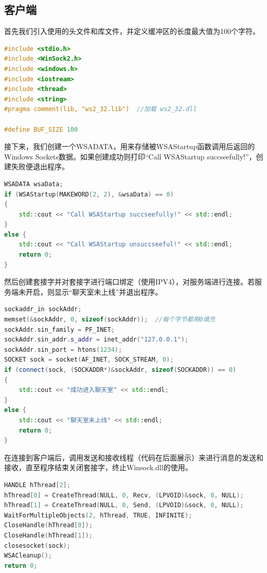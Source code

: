 \documentclass{article}
\begin{document}
\subsection{客户端}
首先我们引入使用的头文件和库文件，并定义缓冲区的长度最大值为100个字符。
\begin{lstlisting}[language = c++]
#include <stdio.h>
#include <WinSock2.h>
#include <windows.h>
#include <iostream>
#include <thread>
#include <string>
#pragma comment(lib, "ws2_32.lib")  //加载 ws2_32.dll

#define BUF_SIZE 100
\end{lstlisting}
接下来，我们创建一个WSADATA，用来存储被WSAStartup函数调用后返回的Windows Sockets数据。如果创建成功则打印“Call WSAStartup succseefully!”，创建失败便退出程序。
\begin{lstlisting}[language = c++]
WSADATA wsaData;
if (WSAStartup(MAKEWORD(2, 2), &wsaData) == 0)
{
	std::cout << "Call WSAStartup succseefully!" << std::endl;
}
else {
	std::cout << "Call WSAStartup unsuccseeful!" << std::endl;
	return 0;
}
\end{lstlisting}
然后创建套接字并对套接字进行端口绑定（使用IPV4），对服务端进行连接。若服务端未开启，则显示“聊天室未上线”并退出程序。
\begin{lstlisting}[language = c++]
sockaddr_in sockAddr;
memset(&sockAddr, 0, sizeof(sockAddr));  //每个字节都用0填充
sockAddr.sin_family = PF_INET;
sockAddr.sin_addr.s_addr = inet_addr("127.0.0.1");
sockAddr.sin_port = htons(1234);
SOCKET sock = socket(AF_INET, SOCK_STREAM, 0);
if (connect(sock, (SOCKADDR*)&sockAddr, sizeof(SOCKADDR)) == 0)
{
	std::cout << "成功进入聊天室" << std::endl;
}
else {
	std::cout << "聊天室未上线" << std::endl;
	return 0;
}
\end{lstlisting}
在连接到客户端后，调用发送和接收线程（代码在后面展示）来进行消息的发送和接收，直至程序结束关闭套接字，终止Winsock.dll的使用。
\begin{lstlisting}[language = c++]
HANDLE hThread[2];
hThread[0] = CreateThread(NULL, 0, Recv, (LPVOID)&sock, 0, NULL);
hThread[1] = CreateThread(NULL, 0, Send, (LPVOID)&sock, 0, NULL);
WaitForMultipleObjects(2, hThread, TRUE, INFINITE);
CloseHandle(hThread[0]);
CloseHandle(hThread[1]);
closesocket(sock); 
WSACleanup(); 
return 0;
\end{lstlisting}
\end{document}
